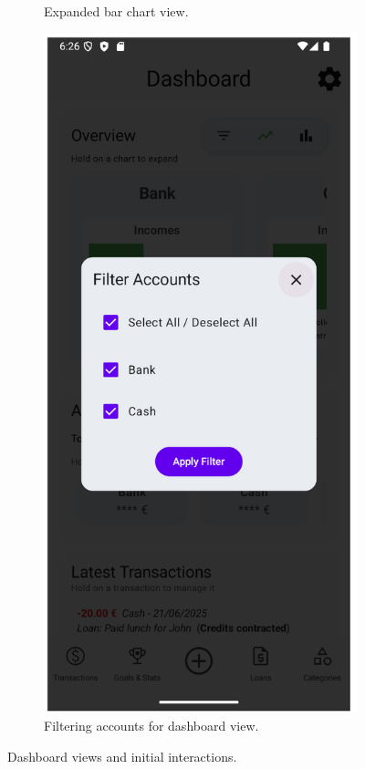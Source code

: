 \documentclass[a4paper,12pt]{article}
\begin{document}
\begin{figure}[H]
\begin{subfigure}[b]{0.23\textwidth}
        \caption{Expanded bar chart view.}
        \label{fig:dashboard_bar_expanded}
    \end{subfigure}
    \hfill
    \begin{subfigure}[b]{0.23\textwidth}
        \includegraphics[width=\textwidth]{chart_dialog_filter.png}
        \caption{Filtering accounts for dashboard view.}
        \label{fig:dashboard_filter_accounts}
    \end{subfigure}
    \caption{Dashboard views and initial interactions.}
    \label{fig:dashboard_interactions}
\end{figure}
\end{document}
